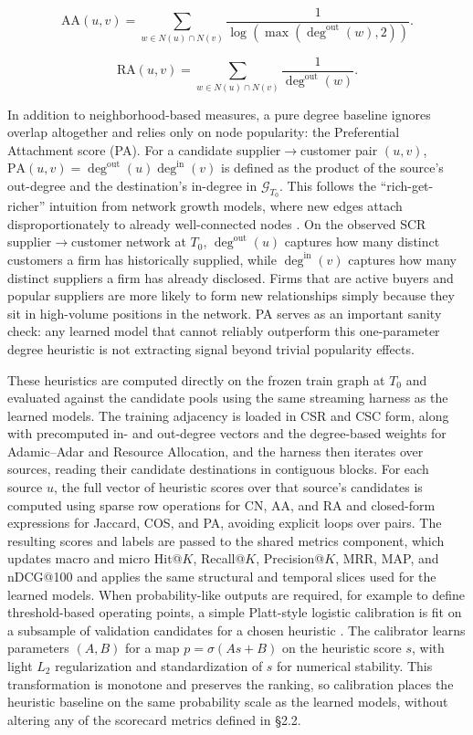 \[
\mathrm{AA}(u,v)
= \sum_{w \in N(u)\cap N(v)} \frac{1}{\log(\max(\deg^{\text{out}}(w), 2))}.
\]

\[
\mathrm{RA}(u,v)
= \sum_{w \in N(u)\cap N(v)} \frac{1}{\deg^{\text{out}}(w)}.
\]
\bigskip

In addition to neighborhood-based measures, a pure degree baseline ignores overlap altogether and relies only on node popularity: the Preferential Attachment score (PA). For a candidate supplier\(\rightarrow\)customer pair \((u,v)\), \(\mathrm{PA}(u,v) = \deg^{\text{out}}(u)\deg^{\text{in}}(v)\) is defined as the product of the source's out-degree and the destination's in-degree in \(\mathcal{G}_{T_0}\). This follows the ``rich-get-richer'' intuition from network growth models, where new edges attach disproportionately to already well-connected nodes \parencite{barabasi_emergence_1999,lu_link_2011}. On the observed SCR supplier\(\rightarrow\)customer network at \(T_0\), \(\deg^{\text{out}}(u)\) captures how many distinct customers a firm has historically supplied, while \(\deg^{\text{in}}(v)\) captures how many distinct suppliers a firm has already disclosed. Firms that are active buyers and popular suppliers are more likely to form new relationships simply because they sit in high-volume positions in the network. PA serves as an important sanity check: any learned model that cannot reliably outperform this one-parameter degree heuristic is not extracting signal beyond trivial popularity effects.

These heuristics are computed directly on the frozen train graph at \(T_0\) and evaluated against the candidate pools using the same streaming harness as the learned models. The training adjacency is loaded in CSR and CSC form, along with precomputed in- and out-degree vectors and the degree-based weights for Adamic--Adar and Resource Allocation, and the harness then iterates over sources, reading their candidate destinations in contiguous blocks. For each source \(u\), the full vector of heuristic scores over that source's candidates is computed using sparse row operations for CN, AA, and RA and closed-form expressions for Jaccard, COS, and PA, avoiding explicit loops over pairs. The resulting scores and labels are passed to the shared metrics component, which updates macro and micro Hit@\(K\), Recall@\(K\), Precision@\(K\), MRR, MAP, and nDCG@100 and applies the same structural and temporal slices used for the learned models. When probability-like outputs are required, for example to define threshold-based operating points, a simple Platt-style logistic calibration is fit on a subsample of validation candidates for a chosen heuristic \parencite{platt_probabilistic_1999,niculescu-mizil_predicting_2005}. The calibrator learns parameters \((A,B)\) for a map \(p = \sigma(A s + B)\) on the heuristic score \(s\), with light \(L_2\) regularization and standardization of \(s\) for numerical stability. This transformation is monotone and preserves the ranking, so calibration places the heuristic baseline on the same probability scale as the learned models, without altering any of the scorecard metrics defined in \S2.2.

